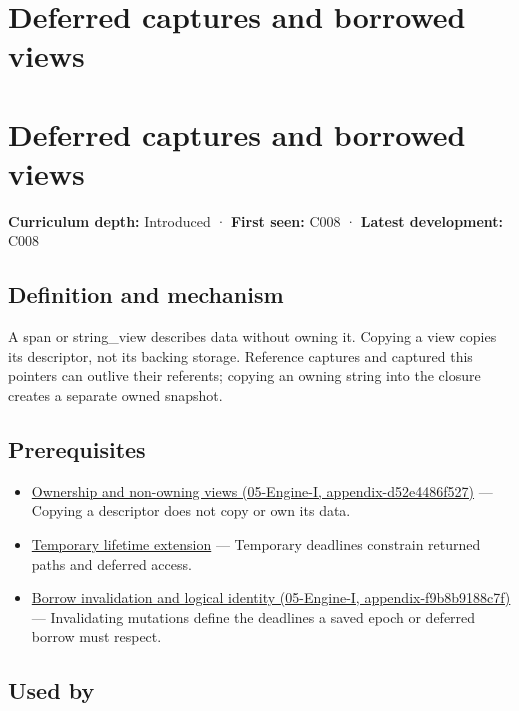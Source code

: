 \hypertarget{appendix-aea529eb5175}{}
\section*{Deferred captures and borrowed views}
\section{Deferred captures and borrowed views}\label{appendix-aea529eb5175-deferred-captures-and-borrowed-views}

\textbf{Curriculum depth:} Introduced · \textbf{First seen:} C008 · \textbf{Latest development:} C008

\subsection{Definition and mechanism}\label{appendix-aea529eb5175-definition-and-mechanism}

A span or string\_view describes data without owning it. Copying a view copies its descriptor, not its backing storage. Reference captures and captured this pointers can outlive their referents; copying an owning string into the closure creates a separate owned snapshot.

\subsection{Prerequisites}\label{appendix-aea529eb5175-prerequisites}

\begin{itemize}
\tightlist
\item
  \href{../05-Engine-I/main.pdf\#nameddest=appendix-d52e4486f527}{Ownership and non-owning views (05-Engine-I, appendix-d52e4486f527)} --- Copying a descriptor does not copy or own its data.
\item
  \hyperref[appendix-a978b29bbbb0]{Temporary lifetime extension} --- Temporary deadlines constrain returned paths and deferred access.
\item
  \href{../05-Engine-I/main.pdf\#nameddest=appendix-f9b8b9188c7f}{Borrow invalidation and logical identity (05-Engine-I, appendix-f9b8b9188c7f)} --- Invalidating mutations define the deadlines a saved epoch or deferred borrow must respect.
\end{itemize}

\subsection{Used by}\label{appendix-aea529eb5175-used-by}

